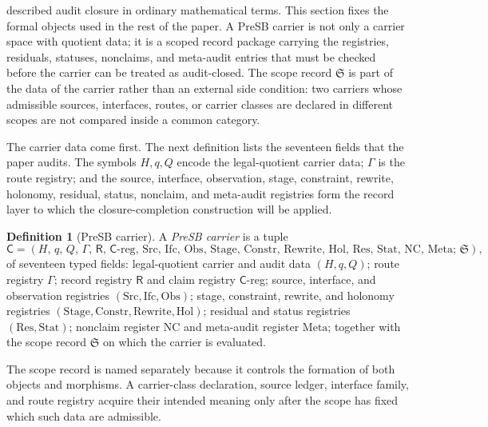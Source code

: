 \documentclass[11pt]{article}
\theoremstyle{definition}
\newtheorem{definition}[theorem]{Definition}
\begin{document}
 described audit closure in ordinary
mathematical terms.  This section fixes the formal objects used in
the rest of the paper.  A PreSB carrier is not only a carrier space
with quotient data; it is a scoped record package carrying the
registries, residuals, statuses, nonclaims, and meta-audit entries
that must be checked before the carrier can be treated as
audit-closed.  The scope record \(\mathfrak S\) is part of the data of
the carrier rather than an external side condition: two carriers
whose admissible sources, interfaces, routes, or carrier classes are
declared in different scopes are not compared inside a common
category.

The carrier data come first.  The next definition lists the seventeen
fields that the paper audits.  The symbols \(H,q,Q\) encode the
legal-quotient carrier data; \(\Gamma\) is the route registry; and
the source, interface, observation, stage, constraint, rewrite,
holonomy, residual, status, nonclaim, and meta-audit registries form
the record layer to which the closure-completion construction will be
applied.

\begin{definition}[PreSB carrier]\label{def:aor:presb-carrier}
A \emph{PreSB carrier} is a tuple
\[
  \mathsf C = (H,\,q,\,Q,\,\Gamma,\,\mathsf R,\,\mathsf C\text{-reg},\,
                \mathrm{Src},\,\mathrm{Ifc},\,\mathrm{Obs},\,
                \mathrm{Stage},\,\mathrm{Constr},\,\mathrm{Rewrite},\,
                \mathrm{Hol},\,\mathrm{Res},\,\mathrm{Stat},\,
                \mathrm{NC},\,\mathrm{Meta};\,\mathfrak S),
\]
of seventeen typed fields: legal-quotient carrier and audit data
$(H,q,Q)$; route registry $\Gamma$; record registry $\mathsf R$ and
claim registry $\mathsf C$-reg; source, interface, and observation
registries $(\mathrm{Src},\mathrm{Ifc},\mathrm{Obs})$; stage, constraint,
rewrite, and holonomy registries
$(\mathrm{Stage},\mathrm{Constr},\mathrm{Rewrite},\mathrm{Hol})$;
residual and status registries $(\mathrm{Res},\mathrm{Stat})$;
nonclaim register $\mathrm{NC}$ and meta-audit register
$\mathrm{Meta}$; together with the scope record $\mathfrak S$ on which
the carrier is evaluated.
\end{definition}

The scope record is named separately because it controls the
formation of both objects and morphisms.  A carrier-class declaration,
source ledger, interface family, and route registry acquire their
intended meaning only after the scope has fixed which such data are
admissible.
\end{document}
